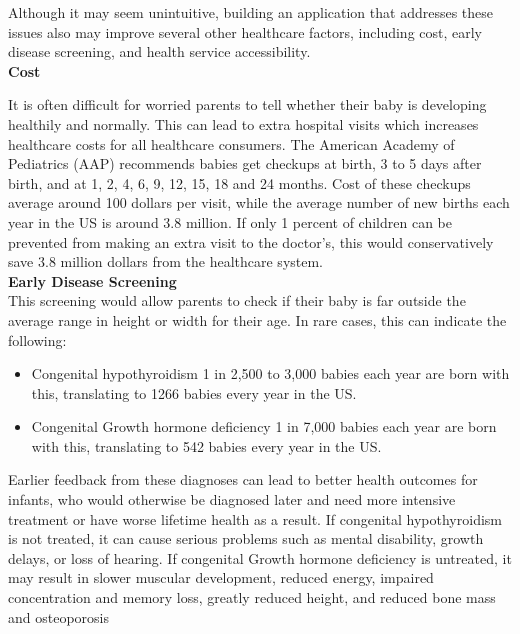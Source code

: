 \documentclass[10pt, draftclsnofoot, letterpaper, margin=.75in, onecolumn]{IEEEtran}
\begin{document}
\par \noindent Although it may seem unintuitive, building an application that addresses these issues also may improve several other healthcare factors, including cost, early disease screening, and health service accessibility.\\

\textbf{Cost}
\par \noindent It is often difficult for worried parents to tell whether their baby is developing healthily and normally. This can lead to extra hospital visits which increases healthcare costs for all healthcare consumers. The American Academy of Pediatrics (AAP) recommends babies get checkups at birth, 3 to 5 days after birth, and at 1, 2, 4, 6, 9, 12, 15, 18 and 24 months\cite{checkup}. Cost of these checkups average around 100 dollars per visit\cite{cost}, while the average number of new births each year in the US is around 3.8 million\cite{births}. If only 1 percent of children can be prevented from making an extra visit to the doctor's, this would conservatively save 3.8 million dollars from the healthcare system.\\

\textbf{Early Disease Screening}\\
This screening would allow parents to check if their baby is far outside the average range in height or width for their age. In rare cases, this can indicate the following:\\
\begin{itemize}
\item Congenital hypothyroidism 1 in 2,500 to 3,000 babies each year are born with this, translating to 1266 babies every year in the US.\\
\item Congenital Growth hormone deficiency 1 in 7,000 babies each year are born with this, translating to 542 babies every year in the US. \\
\end{itemize}
Earlier feedback from these diagnoses can lead to better health outcomes for infants, who would otherwise be diagnosed later and need more intensive treatment or have worse lifetime health as a result. If congenital hypothyroidism is not treated, it can cause serious problems such as mental disability, growth delays, or loss of hearing. If congenital Growth hormone deficiency is untreated, it may result in slower muscular development, reduced energy, impaired concentration and memory loss, greatly reduced height, and reduced bone mass and osteoporosis\\
\end{document}
